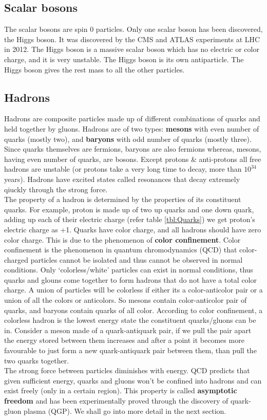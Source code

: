 \documentclass[12pt,a4paper,twoside]{report}
\begin{document}
\subsection{Scalar bosons}
The scalar bosons are spin 0 particles. Only one scalar boson has been discovered, the Higgs boson. It was discovered by the CMS and ATLAS experiments at LHC in 2012.\cite{Ref:higgs-ATLAS}\cite{Ref:higgs-CMS} The Higgs boson is a massive scalar boson which has no electric or color charge, and it is very unstable. The Higgs boson is its own antiparticle. The Higgs boson gives the rest mass to all the other particles.
\subsection{Hadrons}
Hadrons are composite particles made up of different combinations of quarks and held together by gluons. Hadrons are of two types: \textbf{mesons} with even number of quarks (mostly two), and \textbf{baryons} with odd number of quarks (mostly three). Since quarks themselves are fermions, baryons are also fermions whereas, mesons, having even number of quarks, are bosons. Except protons \& anti-protons all free hadrons are unstable (or protons take a very long time to decay, more than $10^{34}$ years). Hadrons have excited states called resonances that decay extremely qiuckly through the strong force.\\

The property of a hadron is determined by the properties of its constituent quarks. For example, proton is made up of two up quarks and one down quark, adding up each of their electric charge (refer table \ref{tbl:Quarks}) we get proton's electric charge as +1. Quarks have color charge, and all hadrons should have zero color charge. This is due to the phenomenon of \textbf{color confinement}. Color confinement is the phenomenon in quantum chromodynamics (QCD) that color-charged particles cannot be isolated and thus cannot be observed in normal conditions. Only `colorless/white' particles can exist in normal conditions, thus quarks and glouns come together to form hadrons that do not have a total color charge. A union of particles will be colorless if either its a color-anticolor pair or a union of all the colors or anticolors. So mesons contain color-anticolor pair of quarks, and baryons contain quarks of all color. According to color confinement, a colorless hadron is the lowest energy state the constituent quarks/gluons can be in. Consider a meson made of a quark-antiquark pair, if we pull the pair apart the energy stored between them increases and after a point it becomes more favourable to just form a new quark-antiquark pair between them, than pull the two quarks together.\\
The strong force between particles diminishes with energy. QCD predicts that given sufficient energy, quarks and gluons won't be confined into hadrons and can exist freely (only in a certain region). This property is called \textbf{asymptotic freedom} and has been experimentally proved through the discovery of quark-gluon plasma (QGP). We shall go into more detail in the next section.\\
 
\end{document}
